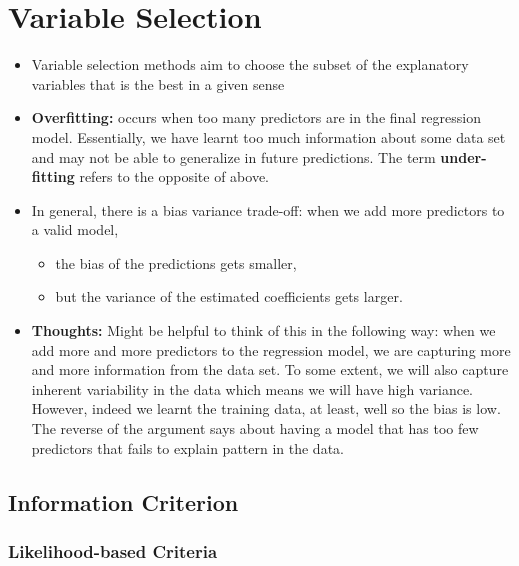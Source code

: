 \documentclass[10pt]{article}
\begin{document}


\section{Variable Selection}
\begin{itemize}
    \item Variable selection methods aim to choose the subset of the explanatory variables that is the best in a given sense
    \item \textbf{Overfitting:} occurs when too many predictors are in the final regression model. Essentially, we have learnt too much information about some data set and may not be able to generalize in future predictions. The term \textbf{under-fitting} refers to the opposite of above.
    \item In general, there is a bias variance trade-off: when we add more predictors to a valid model,
    \begin{itemize}
        \item the bias of the predictions gets smaller,
        \item but the variance of the estimated coefficients gets larger. 
    \end{itemize}
    \item \textbf{Thoughts:} Might be helpful to think of this in the following way: when we add more and more predictors to the regression model, we are capturing more and more information from the data set. To some extent, we will also capture inherent variability in the data which means we will have high variance. However, indeed we learnt the training data, at least, well so the bias is low. The reverse of the argument says about having a model that has too few predictors that fails to explain pattern in the data. 
\end{itemize}
\subsection{Information Criterion}
\subsubsection{Likelihood-based Criteria}
\end{document}
